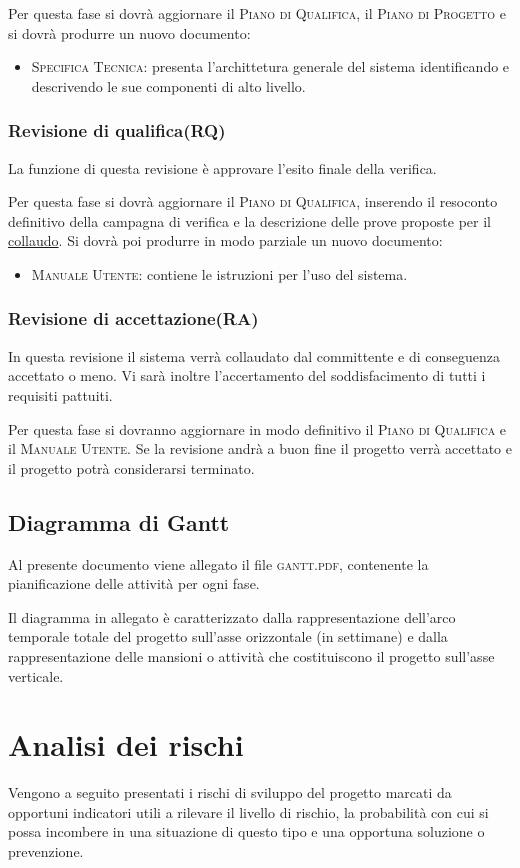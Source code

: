 \documentclass[11pt,a4paper]{article}
\begin{document}
Per questa fase si dovrà aggiornare il \textsc{Piano di Qualifica}, il \textsc{Piano di Progetto} e si dovrà produrre un nuovo documento:
\begin{itemize}
\item \textsc{Specifica Tecnica}: presenta l'archittetura generale del sistema identificando e descrivendo le sue componenti di alto livello.
\end{itemize}
\subsubsection{Revisione di qualifica(RQ)}
La funzione di questa revisione è approvare l'esito finale della verifica.

Per questa fase si dovrà aggiornare il \textsc{Piano di Qualifica}, inserendo il resoconto definitivo della campagna di verifica e la descrizione delle prove proposte per il \underline{collaudo}. Si dovrà poi produrre in modo parziale un nuovo documento:
\begin{itemize}
\item \textsc{Manuale Utente}: contiene le istruzioni per l'uso del sistema.
\end{itemize}
\subsubsection{Revisione di accettazione(RA)}
In questa revisione il sistema verrà collaudato dal committente e di conseguenza accettato o meno.
Vi sarà inoltre l'accertamento del soddisfacimento di tutti i requisiti pattuiti.

Per questa fase si dovranno aggiornare in modo definitivo il \textsc{Piano di Qualifica} e il \textsc{Manuale Utente}.
Se la revisione andrà a buon fine il progetto verrà accettato e il progetto potrà considerarsi terminato.
\subsection{Diagramma di Gantt}
Al presente documento viene allegato il file \textsc{gantt.pdf}, contenente la pianificazione delle attività per ogni fase.

Il diagramma in allegato è caratterizzato dalla rappresentazione dell'arco temporale totale del progetto sull'asse orizzontale (in settimane) e dalla rappresentazione delle mansioni o attività che costituiscono il progetto sull'asse verticale.

\section{Analisi dei rischi}
Vengono a seguito presentati i rischi di sviluppo del progetto marcati da opportuni indicatori utili a rilevare il livello di rischio, la probabilità con cui si possa incombere in una situazione di questo tipo e una opportuna soluzione o prevenzione.
\end{document}

